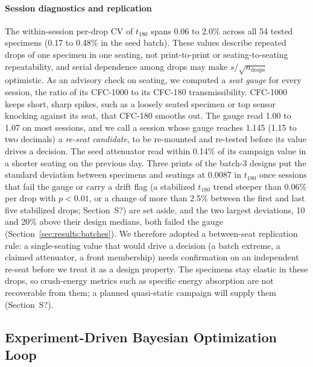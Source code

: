 \documentclass[11pt]{article}
\providecommand{\siref}[1]{S?}
\begin{document}
\paragraph{Session diagnostics and replication} The within-session
per-drop CV of $t_{180}$ spans 0.06 to 2.0\% across all 54 tested
specimens (0.17 to 0.48\% in the seed batch). These values describe
repeated drops of one specimen in one seating, not print-to-print or
seating-to-seating repeatability, and serial dependence among drops may
make $s/\sqrt{n_{\mathrm{drops}}}$ optimistic. As an advisory check on
seating, we computed a \emph{seat gauge} for every session, the ratio of
its CFC-1000 to its CFC-180 transmissibility. CFC-1000 keeps short,
sharp spikes, such as a loosely seated specimen or top sensor knocking
against its seat, that CFC-180 smooths out. The gauge read 1.00 to 1.07
on most sessions, and we call a session whose gauge reaches 1.145 (1.15
to two decimals) a \emph{re-seat candidate}, to be re-mounted and
re-tested before its value drives a decision. The seed attenuator read
within 0.14\% of its campaign value in a shorter seating on the
previous day. Three prints of the
batch-3 designs put the standard deviation between specimens and
seatings at 0.0087 in $t_{180}$ once sessions that fail the gauge or
carry a drift flag (a stabilized $t_{180}$ trend steeper than 0.06\% per
drop with $p < 0.01$, or a change of more than 2.5\% between the first
and last five stabilized drops; Section~\siref{si:drop}) are set aside,
and the two largest deviations, 10
and 20\% above their design medians, both failed the gauge
(Section~\ref{sec:results:batches}). We therefore adopted a
between-seat replication rule: a single-seating value that would drive a
decision (a batch extreme, a claimed attenuator, a front membership)
needs confirmation on an independent re-seat before we treat it as a
design property. The specimens stay elastic in these drops, so
crush-energy metrics such as specific energy absorption are not
recoverable from them; a planned quasi-static campaign will supply them
(Section~\siref{si:quasistatic}).

\subsection{Experiment-Driven Bayesian Optimization Loop}
\label{sec:methods:bo}
\end{document}

